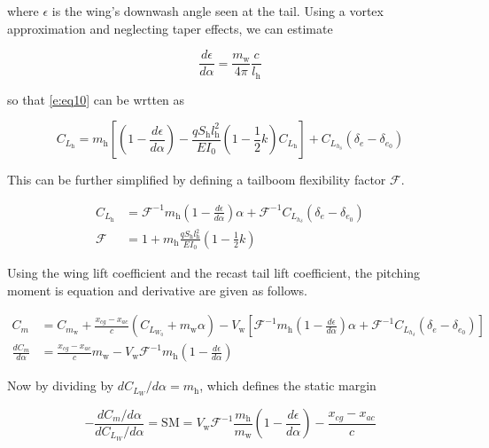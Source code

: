 \documentclass[]{aiaa-tc}%
\begin{document}
where $\epsilon$ is the wing's downwash angle seen at the tail. Using a vortex approximation and neglecting taper effects, we can estimate

\begin{equation}
    \frac{d\epsilon}{d\alpha} = \frac{m_{\text{w}}}{4\pi} \frac{c}{l_{\text{h}}}
\end{equation}

so that \eqref{e:eq10} can be wrtten as

\begin{equation}
    C_{L_{\text{h}}} = m_{\text{h}} \left[\left( 1 - \frac{d\epsilon}{d\alpha}\right) - \frac{qS_{\text{h}}l_{\text{h}}^2}{EI_0}(1-\frac{1}{2}k) C_{L_{\text{h}}}\right] + C_{L_{h_{\delta}}}(\delta_e - \delta_{e_0}) 
\end{equation}

This can be further simplified by defining a tailboom flexibility factor $\mathcal{F}$.

\begin{align}
    C_{L_{\text{h}}} &= \mathcal{F}^{-1} m_{\text{h}} \left( 1 - \frac{d\epsilon}{d\alpha}\right) \alpha + \mathcal{F}^{-1} C_{L_{h_{\delta}}}(\delta_e - \delta_{e_0}) \\
    \mathcal{F} &= 1 + m_{\text{h}} \frac{qS_{\text{h}}l_{\text{h}}^2}{EI_0}(1-\frac{1}{2}k) 
\end{align}

Using the wing lift coefficient and the recast tail lift coefficient, the pitching moment is equation and derivative are given as follows.

\begin{align}
    C_m &= C_{m_{\text{w}}} + \frac{x_{cg} - x_{ac}}{c} (C_{L_{W_0}} + m_{\text{w}} \alpha) - V_{\text{w}} \left[ \mathcal{F}^{-1} m_{\text{h}} \left( 1 - \frac{d\epsilon}{d\alpha}\right) \alpha + \mathcal{F}^{-1} C_{L_{h_{\delta}}}(\delta_e - \delta_{e_0})\right] \\
    \frac{dC_m}{d\alpha} & = \frac{x_{cg} - x_{ac}}{c} m_{\text{w}}  - V_{\text{w}} \mathcal{F}^{-1} m_{\text{h}} \left( 1 - \frac{d\epsilon}{d\alpha}\right) 
\end{align}

Now by dividing by $dC_{L_W}/d\alpha = m_{\text{h}}$, which defines the static margin

\begin{equation}
    -\frac{dC_m/d\alpha}{dC_{L_W}/d\alpha} = \text{SM} = V_{\text{w}} \mathcal{F}^{-1} \frac{m_{\text{h}}}{m_{\text{w}}} \left( 1 - \frac{d\epsilon}{d\alpha}\right) - \frac{x_{cg} - x_{ac}}{c}
\end{equation}
\end{document}
